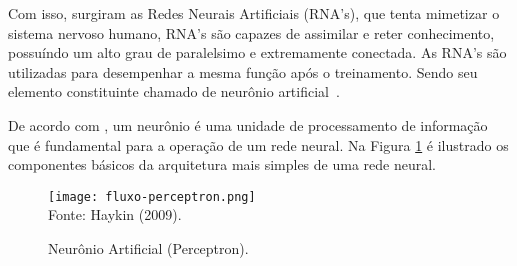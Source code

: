     Com isso, surgiram as Redes Neurais Artificiais (RNA's), que tenta mimetizar o sistema nervoso humano, RNA's são capazes de
    assimilar e reter conhecimento, possuíndo um alto grau de paralelsimo e extremamente conectada. As RNA's são utilizadas para
    desempenhar a mesma função após o treinamento. Sendo seu elemento constituinte chamado de neurônio artificial~\cite{ulinick2019}.

    De acordo com , um neurônio é uma unidade de processamento de informação que é fundamental para a operação de um
    rede neural. Na Figura \ref{fig:fluxo-perceptron} é ilustrado os componentes básicos da arquitetura mais simples de uma rede neural.
    \begin{figure}[!htb]
        \centering
        \caption{Neurônio Artificial (Perceptron).}
        \texttt{[image: fluxo-perceptron.png]}\\
        {\footnotesize Fonte: Haykin (2009).}\
        \label{fig:fluxo-perceptron}
    \end{figure}
    
